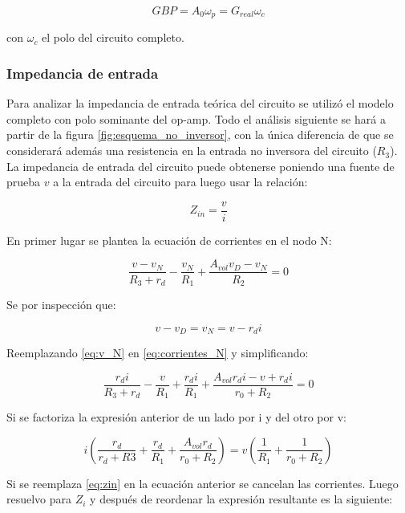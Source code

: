 \begin{equation}\label{eq:GBP}
GBP = A_0\omega_p = G_{real}\omega_c
\end{equation}

con $\omega_c$ el polo del circuito completo.


\subsubsection{Impedancia de entrada}

Para analizar la impedancia de entrada teórica del circuito se utilizó el modelo completo con polo sominante del op-amp. Todo el análisis siguiente se hará a partir de la figura \ref{fig:esquema_no_inversor}, con la única diferencia de que se considerará además una resistencia en la entrada no inversora del circuito ($R_3$). La impedancia de entrada del circuito puede obtenerse poniendo una fuente de prueba $v$ a la entrada del circuito para luego usar la relación:

\begin{equation}\label{eq:zin}
Z_{in} = \frac{v}{i}
\end{equation}

En primer lugar se plantea la ecuación de corrientes en el nodo N:

\begin{equation}\label{eq:corrientes_N}
\frac{v - v_N}{R_3 + r_d} - \frac{v_N}{R_1} + \frac{A_{vol}v_D - v_N}{R_2} = 0
\end{equation}

Se por inspección que:

\begin{equation}\label{eq:v_N}
v - v_D = v_N = v - r_di
\end{equation}

Reemplazando \ref{eq:v_N} en \ref{eq:corrientes_N} y simplificando:

\begin{equation}
\frac{r_di}{R_3 + r_d} - \frac{v}{R_1} + \frac{r_di}{R_1} +\frac{A_{vol}r_di - v + r_di}{r_0 + R_2} = 0
\end{equation}

Si se factoriza la expresión anterior de un lado por i y del otro por v:

\begin{equation}
i(\frac{r_d}{r_d + R3} + \frac{r_d}{R_1} + \frac{A_{vol}r_d}{r_0 + R_2}) = v(\frac{1}{R_1} + \frac{1}{r_0 + R_2})
\end{equation}

Si se reemplaza \ref{eq:zin} en la ecuación anterior se cancelan las corrientes. Luego resuelvo para $Z_i$ y después de reordenar la expresión resultante es la siguiente:

